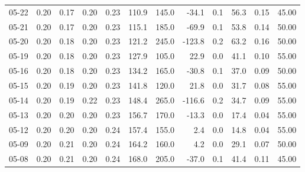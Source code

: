\begin{threeparttable}
{\begin{tabular}{lrrrrrrrrrrr}
  05-22 &          0.20 &          0.17 &          0.20 &        0.23 &               110.9 &               145.0 &      -34.1 &                 0.1 &             56.3 &            0.15 &                  45.00 \\
  05-21 &          0.20 &          0.17 &          0.20 &        0.23 &               115.1 &               185.0 &      -69.9 &                 0.1 &             53.8 &            0.14 &                  50.00 \\
  05-20 &          0.20 &          0.18 &          0.20 &        0.23 &               121.2 &               245.0 &     -123.8 &                 0.2 &             63.2 &            0.16 &                  50.00 \\
  05-19 &          0.20 &          0.18 &          0.20 &        0.23 &               127.9 &               105.0 &       22.9 &                 0.0 &             41.1 &            0.10 &                  55.00 \\
  05-16 &          0.20 &          0.18 &          0.20 &        0.23 &               134.2 &               165.0 &      -30.8 &                 0.1 &             37.0 &            0.09 &                  50.00 \\
  05-15 &          0.20 &          0.19 &          0.20 &        0.23 &               141.8 &               120.0 &       21.8 &                 0.0 &             31.7 &            0.08 &                  55.00 \\
  05-14 &          0.20 &          0.19 &          0.22 &        0.23 &               148.4 &               265.0 &     -116.6 &                 0.2 &             34.7 &            0.09 &                  55.00 \\
  05-13 &          0.20 &          0.20 &          0.20 &        0.23 &               156.7 &               170.0 &      -13.3 &                 0.0 &             17.4 &            0.04 &                  55.00 \\
  05-12 &          0.20 &          0.20 &          0.20 &        0.24 &               157.4 &               155.0 &        2.4 &                 0.0 &             14.8 &            0.04 &                  55.00 \\
  05-09 &          0.20 &          0.21 &          0.20 &        0.24 &               164.2 &               160.0 &        4.2 &                 0.0 &             29.1 &            0.07 &                  50.00 \\
  05-08 &          0.20 &          0.21 &          0.20 &        0.24 &               168.0 &               205.0 &      -37.0 &                 0.1 &             41.4 &            0.11 &                  45.00 \\

\end{tabular}}
\end{threeparttable}
